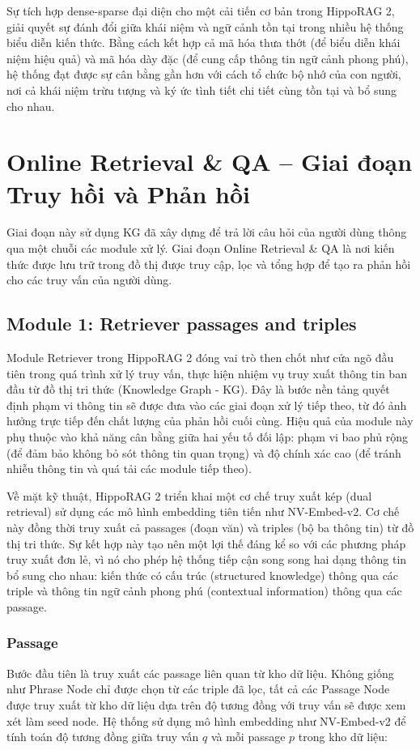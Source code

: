 \documentclass[../main.tex]{subfiles}
\begin{document}
Sự tích hợp dense-sparse đại diện cho một cải tiến cơ bản trong HippoRAG 2, giải quyết sự đánh đổi giữa khái niệm và ngữ cảnh tồn tại trong nhiều hệ thống biểu diễn kiến thức. Bằng cách kết hợp cả mã hóa thưa thớt (để biểu diễn khái niệm hiệu quả) và mã hóa dày đặc (để cung cấp thông tin ngữ cảnh phong phú), hệ thống đạt được sự cân bằng gần hơn với cách tổ chức bộ nhớ của con người, nơi cả khái niệm trừu tượng và ký ức tình tiết chi tiết cùng tồn tại và bổ sung cho nhau.

\section{Online Retrieval \& QA – Giai đoạn Truy hồi và Phản hồi}
Giai đoạn này sử dụng KG đã xây dựng để trả lời câu hỏi của người dùng thông qua một chuỗi các module xử lý. Giai đoạn Online Retrieval \& QA là nơi kiến thức được lưu trữ trong đồ thị được truy cập, lọc và tổng hợp để tạo ra phản hồi cho các truy vấn của người dùng.

\subsection{Module 1: Retriever passages and triples}

Module Retriever trong HippoRAG 2 đóng vai trò then chốt như cửa ngõ đầu tiên trong quá trình xử lý truy vấn, thực hiện nhiệm vụ truy xuất thông tin ban đầu từ đồ thị tri thức (Knowledge Graph - KG). Đây là bước nền tảng quyết định phạm vi thông tin sẽ được đưa vào các giai đoạn xử lý tiếp theo, từ đó ảnh hưởng trực tiếp đến chất lượng của phản hồi cuối cùng. Hiệu quả của module này phụ thuộc vào khả năng cân bằng giữa hai yếu tố đối lập: phạm vi bao phủ rộng (để đảm bảo không bỏ sót thông tin quan trọng) và độ chính xác cao (để tránh nhiễu thông tin và quá tải các module tiếp theo).

Về mặt kỹ thuật, HippoRAG 2 triển khai một cơ chế truy xuất kép (dual retrieval) sử dụng các mô hình embedding tiên tiến như NV-Embed-v2. Cơ chế này đồng thời truy xuất cả passages (đoạn văn) và triples (bộ ba thông tin) từ đồ thị tri thức. Sự kết hợp này tạo nên một lợi thế đáng kể so với các phương pháp truy xuất đơn lẻ, vì nó cho phép hệ thống tiếp cận song song hai dạng thông tin bổ sung cho nhau: kiến thức có cấu trúc (structured knowledge) thông qua các triple và thông tin ngữ cảnh phong phú (contextual information) thông qua các passage.

\subsubsection{Passage}
Bước đầu tiên là truy xuất các passage liên quan từ kho dữ liệu. Không giống như Phrase Node chỉ được chọn từ các triple đã lọc, tất cả các Passage Node được truy xuất từ kho dữ liệu dựa trên độ tương đồng với truy vấn sẽ được xem xét làm seed node. Hệ thống sử dụng mô hình embedding như NV-Embed-v2 để tính toán độ tương đồng giữa truy vấn \(q\) và mỗi passage \(p\) trong kho dữ liệu:
\end{document}
